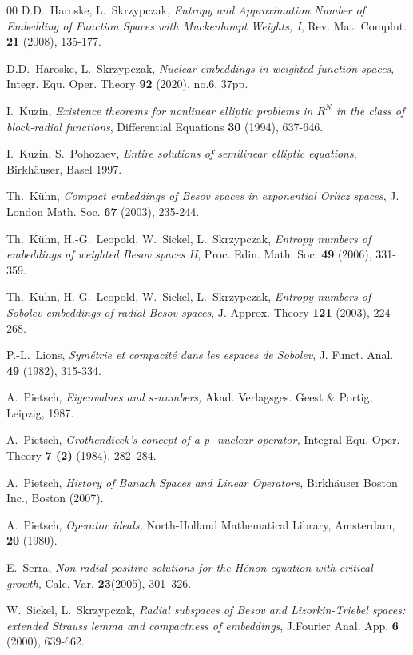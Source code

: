 \documentclass[12pt]{article}
\begin{document}
\begin{thebibliography}{00}
 D.D.~Haroske, L.~Skrzypczak, {\sl Entropy and Approximation Number of Embedding of Function Spaces with Muckenhoupt Weights, I}, Rev. Mat. Complut. \textbf{21} (2008), 135-177.

 D.D.~Haroske, L.~Skrzypczak, {\sl Nuclear embeddings in weighted function spaces}, Integr. Equ. Oper. Theory \textbf{92} (2020), no.6, 37pp.

I.~Kuzin, {\sl Existence theorems for nonlinear  elliptic problems in $R^N$ in the class of block-radial functions}, 
Differential Equations {\bf 30} (1994), 637-646.


I.~Kuzin, S.~Pohozaev, {\sl Entire solutions of semilinear
	elliptic equations}, Birkh\"auser, Basel 1997.

Th.~K\"uhn, {\sl Compact embeddings of Besov spaces in exponential Orlicz spaces}, J. London Math. Soc. {\bf 67} (2003), 235-244. 



Th.~K\"uhn, H.-G.~Leopold, W.~Sickel, L.~Skrzypczak, {\sl Entropy numbers of embeddings of weighted Besov spaces II},
Proc. Edin. Math. Soc. {\bf 49} (2006), 331-359.

Th.~K\"uhn, H.-G.~Leopold, W.~Sickel, L.~Skrzypczak, {\sl Entropy
	numbers of Sobolev embeddings of radial Besov spaces},
J. Approx. Theory {\bf 121} (2003), 224-268.

   

P.-L.~Lions, {\sl Sym\'etrie et compacit\'e dans les
	espaces de Sobolev}, J. Funct. Anal. {\bf 49} (1982), 315-334.


A.~Pietsch, {\sl Eigenvalues and $s$-numbers,}
Akad. Verlagsges. Geest \& Portig, Leipzig, 1987. 

A.~Pietsch, {\sl Grothendieck’s concept of a  p -nuclear operator,} Integral Equ. Oper. Theory {\bf 7 (2)} (1984), 282–284.

A.~Pietsch, {\sl History of Banach Spaces and Linear Operators,} Birkhäuser Boston Inc., Boston (2007).

A.~Pietsch, {\sl Operator ideals,} North-Holland Mathematical Library, Amsterdam, {\bf 20} (1980).

E.~Serra, {\sl
Non radial positive solutions for the H\'enon equation
with critical growth}, Calc. Var. {\bf 23}(2005), 301–326. 



 W.~Sickel, L.~Skrzypczak, {\sl Radial  subspaces of Besov and Lizorkin-Triebel  spaces: extended Strauss lemma and compactness of embeddings}, J.Fourier Anal. App. \textbf{6} (2000), 639-662. 





\end{thebibliography}
\end{document}
